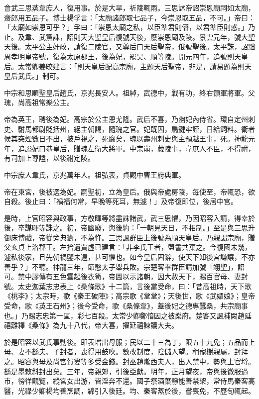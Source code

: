 \begin{pinyinscope}
 會武三思蒸韋庶人，復用事。於是大旱，祈陵輒雨。三思訹帝詔崇恩廟祠如太廟，齋郎用五品子。博士楊孚言：「太廟諸郎取七品子，今崇恩取五品，不可。」帝曰：「太廟如崇恩可乎？」孚曰：「崇恩太廟之私，以臣準君則僭，以君準臣則惑。」乃止。及韋、武黨誅，詔則天大聖皇后復號天後，廢崇恩廟及陵。景雲元年，號大聖天後。太平公主奸政，請復二陵官，又尊后曰天后聖帝，俄號聖後。太平誅，詔黜周孝明皇帝號，復為太原郡王，後為妃，罷昊、順等陵。開元四年，追號則天皇后。太常卿姜晈建言：「則天皇后配高宗廟，主題天后聖帝，非是，請易題為則天皇后武氏。」制可。



 中宗和思順聖皇后趙氏，京兆長安人。祖綽，武德中，戰有功，終右領軍將軍。父瑰，尚高祖常樂公主。



 帝為英王，聘後為妃。高宗於公主恩尤隆。武后不喜，乃幽妃內侍省。環自定州刺史、駙馬都尉貶括州，絕主朝謁，隨瑰之官。妃既囚，扃鍵牢謹，日給飼料。衛者候其突煙數日不出，披戶視之，死腐矣，瑰以壽州刺史與主預越王事，死。神龍元年，追謚妃曰恭皇后，贈瑰左衛大將軍。中宗崩，蕆陵事，韋庶人不臣，不得祔，有司加上尊謚，以後祔定陵。



 中宗庶人韋氏，京兆萬年人。祖弘表，貞觀中曹王府典軍。



 帝在東宮，後被選為妃。嗣聖初，立為皇后。俄與帝處房陵，每使至，帝輒恐，欲自殺。後止曰：「禍福何常，早晚等死耳，無遽！」及帝復即位，後居中宮。



 是時，上官昭容與政事，方敬暉等將盡誅諸武，武三思懼，乃因昭容入請，得幸於後，卒謀暉等誅之。初，帝幽廢，與後約：「一朝見天日，不相制。」至是與三思升御床博戲，帝從旁典籌，不為忤。三思諷群臣上後號為順天皇后。乃親謁宗廟，贈父玄貞上洛郡王。左拾遺賈虛已建言：「非李氏王者，盟書共棄之。今復國未幾，遽私後家，且先朝禍鑒未遠，甚可懼也。如今皇后固辭，使天下知後宮謙讓，不亦善乎？」不聽。神龍三年，節愍太子舉兵敗。宗楚客率群臣請加號「翊聖」，詔可。禁中謬傳有五色雲起後衣笥，帝圖以示諸朝，因大赦天下，賜百官母、妻封號。太史迦葉志忠表上《桑條歌》十二篇，言後當受命，曰：「昔高祖時，天下歌《桃李》；太宗時，歌《秦王破陣》；高宗歌《堂堂》；天後世，歌《武媚娘》；皇帝受命，歌《英王石州》；後今受命，歌《桑條韋》，蓋後妃之德專蠶桑，共宗廟事也。」乃賜志忠第一區，彩七百段。太常少卿鄭愔因之被樂府。楚客又諷補闕趙延禧離釋《桑條》為九十八代，帝大喜，擢延禧諫議大夫。



 於是昭容以武氏事動後。即表增出母服；民以二十三為丁，限五十九免；五品而上母、妻不繇夫、子封者，喪得用鼓吹。數改制度，陰儲人望。稍寵樹親屬，封拜之。昭容與母及尚宮賀婁等多受金錢。封巫趙隴西夫人，出入禁中，勢與上官埒。繇是墨敕斜封出矣。三年，帝親郊，引後亞獻。明年，正月望夜，帝與後微服過市，徬徉觀覽，縱宮女出游，皆淫奔不還。國子祭酒葉靜能善禁架，常侍馬秦客高醫，光祿少卿楊均善烹調，綿引入後廷。均、秦客蒸於後，嘗喪免，不歷旬輒起。




\end{pinyinscope}
